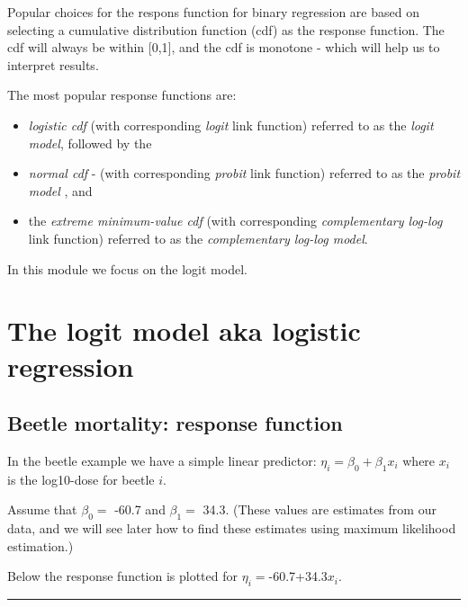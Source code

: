 \documentclass[
]{article}
\begin{document}
Popular choices for the respons function for binary regression are based
on selecting a cumulative distribution function (cdf) as the response
function. The cdf will always be within {[}0,1{]}, and the cdf is
monotone - which will help us to interpret results.

The most popular response functions are:

\begin{itemize}
\item
  \emph{logistic cdf} (with corresponding \emph{logit} link function)
  referred to as the \emph{logit model}, followed by the
\item
  \emph{normal cdf} - (with corresponding \emph{probit} link function)
  referred to as the \emph{probit model} , and
\item
  the \emph{extreme minimum-value cdf} (with corresponding
  \emph{complementary log-log} link function) referred to as the
  \emph{complementary log-log model}.
\end{itemize}

In this module we focus on the logit model.

\hypertarget{the-logit-model-aka-logistic-regression}{%
\section{The logit model aka logistic
regression}\label{the-logit-model-aka-logistic-regression}}

\hypertarget{beetle-mortality-response-function}{%
\subsection{Beetle mortality: response
function}\label{beetle-mortality-response-function}}

In the beetle example we have a simple linear predictor:
\(\eta_i=\beta_0+\beta_1 x_i\) where \(x_i\) is the log10-dose for
beetle \(i\).

Assume that \(\beta_0=\) -60.7 and \(\beta_1=\) 34.3. (These values are
estimates from our data, and we will see later how to find these
estimates using maximum likelihood estimation.)

Below the response function is plotted for \(\eta_i=\)-60.7+34.3\(x_i\).

\begin{center}\rule{0.5\linewidth}{0.5pt}\end{center}
\end{document}
